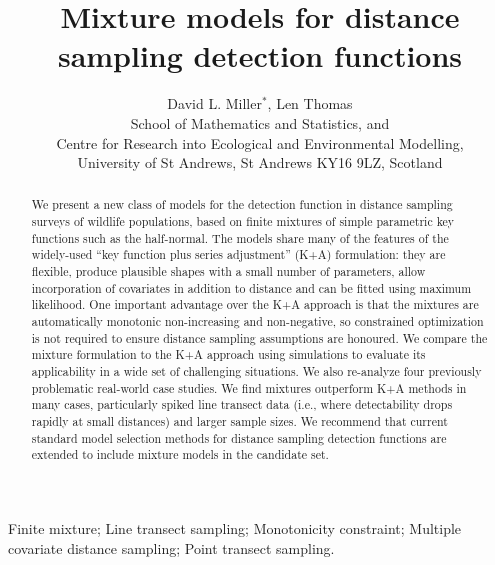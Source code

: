 \documentclass[useAMS,referee,usenatbib]{biom}
\title[Mixture model detection functions]{Mixture models for distance sampling detection functions}
\author{David L. Miller$^{*}$\email{dave@ninepointeightone.net}, Len Thomas\\
School of Mathematics and Statistics, and \\
Centre for Research into Ecological and Environmental Modelling,\\
University of St Andrews, St Andrews KY16 9LZ, Scotland}
\begin{document}
\label{firstpage}

\begin{abstract}
We present a new class of models for the detection function in distance sampling surveys of wildlife populations, based on finite mixtures of simple parametric key functions such as the half-normal. The models share many of the features of the widely-used ``key function plus series adjustment'' (K+A) formulation: they are flexible, produce plausible shapes with a small number of parameters, allow incorporation of covariates in addition to distance and can be fitted using maximum likelihood. One important advantage over the K+A approach is that the mixtures are automatically monotonic non-increasing and non-negative, so constrained optimization is not required to ensure distance sampling assumptions are honoured. We compare the mixture formulation to the K+A approach using simulations to evaluate its applicability in a wide set of challenging situations. We also re-analyze four previously problematic real-world case studies.  We find mixtures outperform K+A methods in many cases, particularly spiked line transect data (i.e., where detectability drops rapidly at small distances) and larger sample sizes.  We recommend that current standard model selection methods for distance sampling detection functions are extended to include mixture models in the candidate set.
\end{abstract}

\begin{keywords}
Finite mixture; Line transect sampling; Monotonicity constraint; Multiple covariate distance sampling; Point transect sampling.
\end{keywords}

\maketitle


\end{document}

